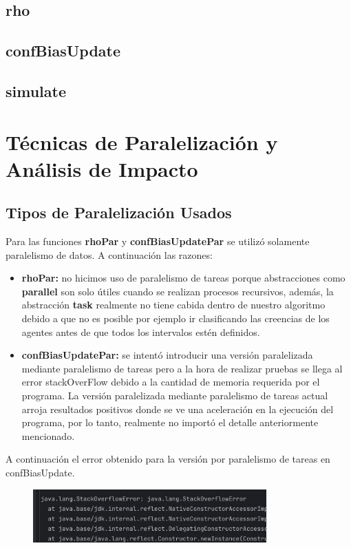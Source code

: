 \documentclass{article}
\begin{document}
    \subsection{rho}

    \subsection{confBiasUpdate}

    \subsection{simulate}

  \section{Técnicas de Paralelización y Análisis de Impacto}

    \subsection{Tipos de Paralelización Usados}
    Para las funciones \textbf{rhoPar} y \textbf{confBiasUpdatePar} se utilizó solamente paralelismo de datos. A continuación  las razones:

    \begin{itemize}
      \item \textbf{rhoPar:} no hicimos uso de paralelismo de tareas porque abstracciones como \textbf{parallel} son solo útiles cuando se realizan procesos recursivos, además, la abstracción \textbf{task} realmente no tiene cabida dentro de nuestro algoritmo debido a que no es posible por ejemplo ir clasificando las creencias de los agentes antes de que todos los intervalos estén definidos.
      \item \textbf{confBiasUpdatePar:} se intentó introducir una versión paralelizada mediante paralelismo de tareas pero a la hora de realizar pruebas se llega al error stackOverFlow debido a la cantidad de memoria requerida por el programa. La versión paralelizada mediante paralelismo de tareas actual arroja resultados positivos donde se ve una aceleración en la ejecución del programa, por lo tanto, realmente no importó el detalle anteriormente mencionado.
    \end{itemize}

    A continuación el error obtenido para la versión por paralelismo de tareas en confBiasUpdate.

    \begin{figure}[H]
      \centering
      \includegraphics[width=0.8\textwidth]{images/stackOverFlow.jpg}
    \end{figure}
\end{document}
